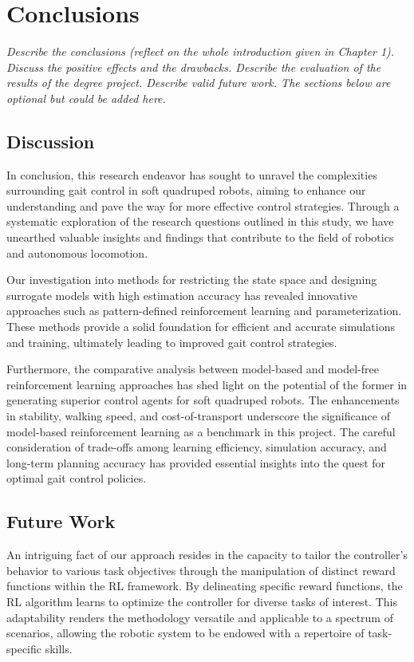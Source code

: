 \chapter{Conclusions}
\label{chap6}
\textit{Describe the conclusions (reflect on the whole introduction given in Chapter 1). Discuss the positive effects and the drawbacks. Describe the evaluation of the results of the degree project. Describe valid future work. The sections below are optional but could be added here.}

\section{Discussion}
In conclusion, this research endeavor has sought to unravel the complexities surrounding gait control in soft quadruped robots, aiming to enhance our understanding and pave the way for more effective control strategies. Through a systematic exploration of the research questions outlined in this study, we have unearthed valuable insights and findings that contribute to the field of robotics and autonomous locomotion.

Our investigation into methods for restricting the state space and designing surrogate models with high estimation accuracy has revealed innovative approaches such as pattern-defined reinforcement learning and parameterization. These methods provide a solid foundation for efficient and accurate simulations and training, ultimately leading to improved gait control strategies.

Furthermore, the comparative analysis between model-based and model-free reinforcement learning approaches has shed light on the potential of the former in generating superior control agents for soft quadruped robots. The enhancements in stability, walking speed, and cost-of-transport underscore the significance of model-based reinforcement learning as a benchmark in this project. The careful consideration of trade-offs among learning efficiency, simulation accuracy, and long-term planning accuracy has provided essential insights into the quest for optimal gait control policies.

\section{Future Work}

An intriguing fact of our approach resides in the capacity to tailor the controller's behavior to various task objectives through the manipulation of distinct reward functions within the RL framework. By delineating specific reward functions, the RL algorithm learns to optimize the controller for diverse tasks of interest. This adaptability renders the methodology versatile and applicable to a spectrum of scenarios, allowing the robotic system to be endowed with a repertoire of task-specific skills.

